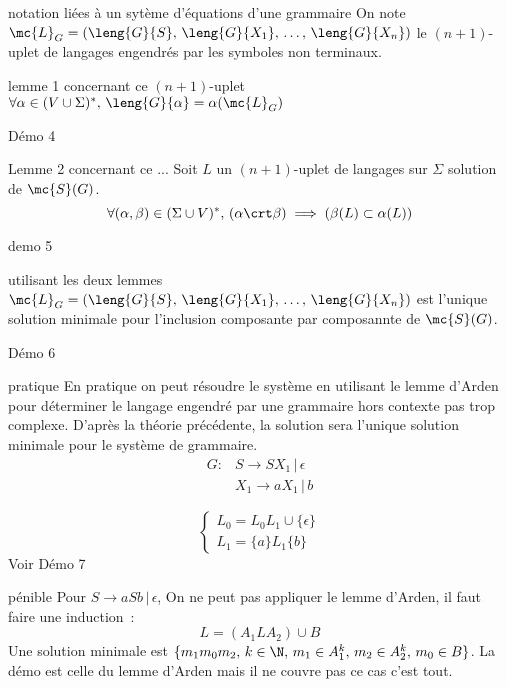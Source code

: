 \begin{adjustwidth}{-3cm}{-3cm}
\begin{remarque}{}{notation liées à un sytème d'équations d'une grammaire}
    On note $\mc{L}_G = (\leng{G}{S},\, \leng{G}{X_1},\,\dots,\,  \leng{G}{X_n})$ le $(n+1)$-uplet de langages engendrés par les symboles non terminaux.
\end{remarque}

\begin{proposition}{}{lemme 1 concernant ce $(n+1)$-uplet}
    $\forall \alpha \in (V \cup \Sigma)^*,\, \leng{G}{\alpha} = \alpha(\mc{L}_G)$
\end{proposition}
Démo 4

\begin{proposition}{}{Lemme 2 concernant ce ...}
    Soit $L$ un $(n+1)$-uplet de langages sur $\Sigma$ solution de $\mc{S}(G)$.\\
    $$\forall (\alpha,\beta) \in (\Sigma \cup V)^*,\, (\alpha \crt \beta) \implies (\beta(L) \subset \alpha(L))$$
\end{proposition}
demo 5

\begin{theoreme}{}{utilisant les deux lemmes}
    $\mc{L}_G = (\leng{G}{S},\, \leng{G}{X_1},\,\dots,\,  \leng{G}{X_n})$  est l'unique solution minimale pour l'inclusion composante par composannte de $\mc{S}(G)$.
\end{theoreme}
Démo 6

\begin{exemple}{}{pratique}
    En pratique on peut résoudre le système en utilisant le lemme d'Arden pour déterminer le langage engendré par une grammaire hors contexte pas trop complexe. D'après la théorie précédente, la solution sera l'unique solution minimale pour le système de grammaire.
    \begin{align*}
        G : &S \rightarrow  SX_1 \,\vert\, \epsilon\\
        &X_1 \rightarrow aX_1 \,\vert\, b 
    \end{align*}

    $$\begin{cases*}
        L_0 = L_0L_1 \cup \{\epsilon\}\\
        L_1 = \{a\}L_1\{b\}
    \end{cases*}$$
    Voir Démo 7
\end{exemple}

\begin{exemple}{}{pénible}
    Pour $S\rightarrow aSb \,\vert\, \epsilon$,
    On ne peut pas appliquer le lemme d'Arden, il faut faire une induction~:
    $$L = (A_1LA_2) \cup B$$
    Une solution minimale est $\{m_1 m_0 m_2,\, k \in \N,\, m_1 \in A_1^k,\, m_2 \in A_2^k,\, m_0 \in B\}$. La démo est celle du lemme d'Arden mais il ne couvre pas ce cas c'est tout.
\end{exemple}


\end{adjustwidth}
